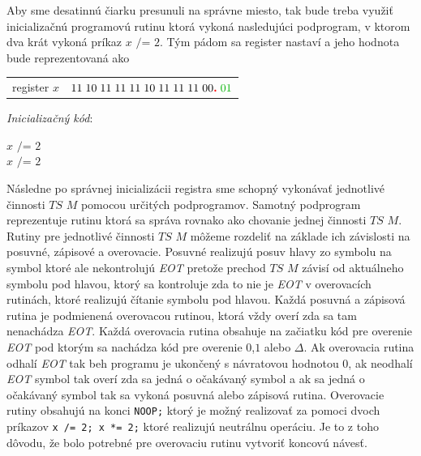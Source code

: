\documentclass[11pt,a4paper]{article}
\newcommand{\red}[1]{\textcolor{red}{#1}}
\newcommand{\green}[1]{\textcolor{OliveGreen}{#1}}
\begin{document}
Aby sme desatinnú čiarku presunuli na správne miesto, tak bude treba využiť inicializačnú programovú rutinu ktorá vykoná nasledujúci podprogram, v ktorom dva krát vykoná príkaz $x \texttt{ /= } 2$. Tým pádom sa register nastaví a jeho hodnota bude reprezentovaná ako

\begin{center}
    \begin{tabular}{r | l}
        register $x$ & $11 \hspace{1mm} 10 \hspace{1mm} 11 \hspace{1mm} 11 \hspace{1mm} 11 \hspace{1mm} 10 \hspace{1mm} 11 \hspace{1mm} 11 \hspace{1mm} 11 \hspace{1mm} 00 \red{\textbf{.}} \hspace{1mm} \green{01} $
    \end{tabular}
\end{center}

\newpage

\textit{Inicializačný kód}:
\begin{flushright}
\begin{minipage}{0.90\textwidth}
    $x \texttt{ /= } 2$\\
    $x \texttt{ /= } 2$\\
\end{minipage}
\end{flushright}

Následne po správnej inicializácii registra sme schopný vykonávať jednotlivé činnosti $TS$ $M$ pomocou určitých podprogramov. Samotný podprogram reprezentuje rutinu ktorá sa správa rovnako ako chovanie jednej činnosti $TS$ $M$.\\

Rutiny pre jednotlivé činnosti $TS$ $M$ môžeme rozdeliť na základe ich závislosti na posuvné, zápisové a overovacie. Posuvné realizujú posuv hlavy zo symbolu na symbol ktoré ale nekontrolujú \green{\textit{EOT}} pretože prechod $TS$ $M$ závisí od aktuálneho symbolu pod hlavou, ktorý sa kontroluje zda to nie je \green{\textit{EOT}} v overovacích rutinách, ktoré realizujú čítanie symbolu pod hlavou. Každá posuvná a zápisová rutina je podmienená overovacou rutinou, ktorá vždy overí zda sa tam nenachádza \green{\textit{EOT}}. Každá overovacia rutina obsahuje na začiatku kód pre overenie \green{\textit{EOT}} pod ktorým sa nachádza kód pre overenie $0$,$1$ alebo $\Delta$. Ak overovacia rutina odhalí \green{\textit{EOT}} tak beh programu je ukončený s návratovou hodnotou $0$, ak neodhalí \green{\textit{EOT}} symbol tak overí zda sa jedná o očakávaný symbol a ak sa jedná o očakávaný symbol tak sa vykoná posuvná alebo zápisová rutina. Overovacie rutiny obsahujú na konci \texttt{NOOP;} ktorý je možný realizovať za pomoci dvoch príkazov \texttt{x /= 2; x *= 2;} ktoré realizujú neutrálnu operáciu. Je to z toho dôvodu, že bolo potrebné pre overovaciu rutinu vytvoriť koncovú návesť.\\
\end{document}
